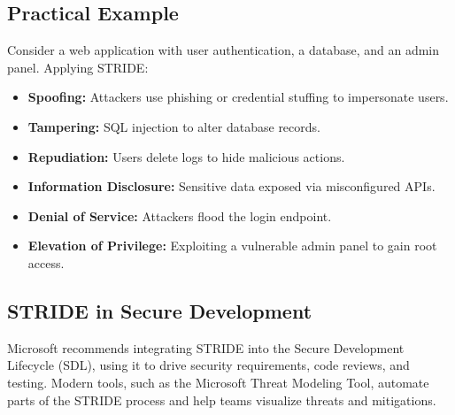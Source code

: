 \subsection*{Practical Example}
Consider a web application with user authentication, a database, and an admin panel. Applying STRIDE:
\begin{itemize}
	\item \textbf{Spoofing:} Attackers use phishing or credential stuffing to impersonate users.
	\item \textbf{Tampering:} SQL injection to alter database records.
	\item \textbf{Repudiation:} Users delete logs to hide malicious actions.
	\item \textbf{Information Disclosure:} Sensitive data exposed via misconfigured APIs.
	\item \textbf{Denial of Service:} Attackers flood the login endpoint.
	\item \textbf{Elevation of Privilege:} Exploiting a vulnerable admin panel to gain root access.
\end{itemize}

\subsection*{STRIDE in Secure Development}
Microsoft recommends integrating STRIDE into the Secure Development Lifecycle (SDL), using it to drive security requirements, code reviews, and testing. Modern tools, such as the Microsoft Threat Modeling Tool, automate parts of the STRIDE process and help teams visualize threats and mitigations\cite{shostack2014,owasp}.
